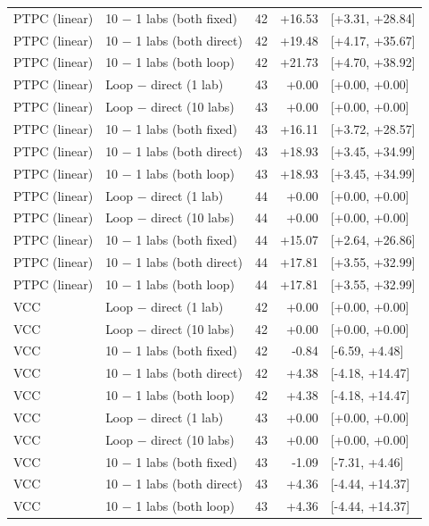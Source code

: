 \begin{longtable}{llrrl}
PTPC (linear) & 10 $-$ 1 labs (both fixed) & 42 & +16.53 & [+3.31, +28.84] \\
PTPC (linear) & 10 $-$ 1 labs (both direct) & 42 & +19.48 & [+4.17, +35.67] \\
PTPC (linear) & 10 $-$ 1 labs (both loop) & 42 & +21.73 & [+4.70, +38.92] \\
\midrule
PTPC (linear) & Loop $-$ direct (1 lab) & 43 & +0.00 & [+0.00, +0.00] \\
PTPC (linear) & Loop $-$ direct (10 labs) & 43 & +0.00 & [+0.00, +0.00] \\
PTPC (linear) & 10 $-$ 1 labs (both fixed) & 43 & +16.11 & [+3.72, +28.57] \\
PTPC (linear) & 10 $-$ 1 labs (both direct) & 43 & +18.93 & [+3.45, +34.99] \\
PTPC (linear) & 10 $-$ 1 labs (both loop) & 43 & +18.93 & [+3.45, +34.99] \\
\midrule
PTPC (linear) & Loop $-$ direct (1 lab) & 44 & +0.00 & [+0.00, +0.00] \\
PTPC (linear) & Loop $-$ direct (10 labs) & 44 & +0.00 & [+0.00, +0.00] \\
PTPC (linear) & 10 $-$ 1 labs (both fixed) & 44 & +15.07 & [+2.64, +26.86] \\
PTPC (linear) & 10 $-$ 1 labs (both direct) & 44 & +17.81 & [+3.55, +32.99] \\
PTPC (linear) & 10 $-$ 1 labs (both loop) & 44 & +17.81 & [+3.55, +32.99] \\
\midrule
VCC & Loop $-$ direct (1 lab) & 42 & +0.00 & [+0.00, +0.00] \\
VCC & Loop $-$ direct (10 labs) & 42 & +0.00 & [+0.00, +0.00] \\
VCC & 10 $-$ 1 labs (both fixed) & 42 & -0.84 & [-6.59, +4.48] \\
VCC & 10 $-$ 1 labs (both direct) & 42 & +4.38 & [-4.18, +14.47] \\
VCC & 10 $-$ 1 labs (both loop) & 42 & +4.38 & [-4.18, +14.47] \\
\midrule
VCC & Loop $-$ direct (1 lab) & 43 & +0.00 & [+0.00, +0.00] \\
VCC & Loop $-$ direct (10 labs) & 43 & +0.00 & [+0.00, +0.00] \\
VCC & 10 $-$ 1 labs (both fixed) & 43 & -1.09 & [-7.31, +4.46] \\
VCC & 10 $-$ 1 labs (both direct) & 43 & +4.36 & [-4.44, +14.37] \\
VCC & 10 $-$ 1 labs (both loop) & 43 & +4.36 & [-4.44, +14.37] \\

\end{longtable}
